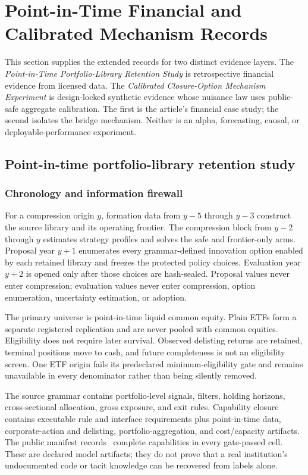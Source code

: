 \section{Point-in-Time Financial and Calibrated Mechanism Records}
\label{sec:supp-point-in-time-financial}

This section supplies the extended records for two distinct evidence layers.
The \emph{Point-in-Time Portfolio-Library Retention Study} is retrospective
financial evidence from licensed data. The \emph{Calibrated Closure-Option
Mechanism Experiment} is design-locked synthetic evidence whose nuisance law
uses public-safe aggregate calibration. The first is the article's financial
case study; the second isolates the bridge mechanism. Neither is an alpha,
forecasting, causal, or deployable-performance experiment.

\subsection{Point-in-time portfolio-library retention study}

\subsubsection{Chronology and information firewall}

For a compression origin \(y\), formation data from \(y-5\) through \(y-3\)
construct the source library and its operating frontier. The compression block
from \(y-2\) through \(y\) estimates strategy profiles and solves the safe and
frontier-only arms. Proposal year \(y+1\) enumerates every grammar-defined
innovation option enabled by each retained library and freezes the protected
policy choices. Evaluation year \(y+2\) is opened only after those choices are
hash-sealed. Proposal values never enter compression; evaluation values never
enter compression, option enumeration, uncertainty estimation, or adoption.

The primary universe is point-in-time liquid common equity. Plain ETFs form a
separate registered replication and are never pooled with common equities.
Eligibility does not require later survival. Observed delisting returns are
retained, terminal positions move to cash, and future completeness is not an
eligibility screen. One ETF origin fails its predeclared minimum-eligibility
gate and remains unavailable in every denominator rather than being silently
removed.

The source grammar contains portfolio-level signals, filters, holding horizons,
cross-sectional allocation, gross exposure, and exit rules. Capability closure
contains executable rule and interface requirements plus point-in-time data,
corporate-action and delisting, portfolio-aggregation, and cost/capacity
artifacts. The public manifest records \AORPointInTimeCapabilities\ complete
capabilities in every gate-passed cell. These are declared model artifacts;
they do not prove that a real institution's undocumented code or tacit
knowledge can be recovered from labels alone.

